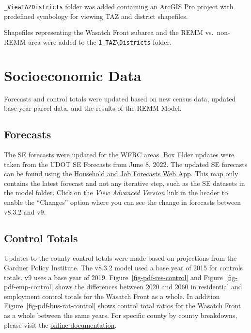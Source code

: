 \documentclass[
  letterpaper,
  DIV=11,
  numbers=noendperiod]{scrreprt}
\begin{document}
\texttt{\_ViewTAZDistricts} folder was added containing an ArcGIS Pro
project with predefined symbology for viewing TAZ and district
shapefiles.

Shapefiles representing the Wasatch Front subarea and the REMM
vs.~non-REMM area were added to the
\texttt{1\_TAZ\textbackslash{}Districts} folder.

\hypertarget{socioeconomic-data}{%
\section{Socioeconomic Data}\label{socioeconomic-data}}

Forecasts and control totals were updated based on new census data,
updated base year parcel data, and the results of the REMM Model.

\hypertarget{forecasts}{%
\subsection{Forecasts}\label{forecasts}}

The SE forecasts were updated for the WFRC areas. Box Elder updates were
taken from the UDOT SE Forecasts from June 8, 2022. The updated SE
forecasts can be found using the
\href{https://wfrc.org/household-job-forecast-map}{Household and Job
Forecasts Web App}. This map only contains the latest forecast and not
any iterative step, such as the SE datasets in the model folder. Click
on the \emph{View Advanced Version} link in the header to enable the
``Changes'' option where you can see the change in forecasts between
v8.3.2 and v9.

\hypertarget{control-totals}{%
\subsection{Control Totals}\label{control-totals}}

Updates to the county control totals were made based on projections from
the Gardner Policy Institute. The v8.3.2 model used a base year of 2015
for controls totals. v9 uses a base year of 2019.
Figure~\ref{fig-pdf-res-control} and Figure~\ref{fig-pdf-emp-control}
shows the differences between 2020 and 2060 in residential and
employment control totals for the Wasatch Front as a whole. In addition
Figure~\ref{fig-pdf-bus-rat-control} shows control total ratios for the
Wasatch Front as a whole between the same years. For specific county by
county breakdowns, please visit the
\href{https://wfrc.org/wftdm-docs/v9x/v900/whats-new/2-inputdata.html}{online
documentation}.
\end{document}
